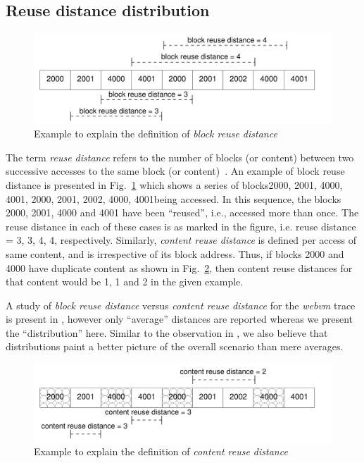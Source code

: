\subsection{Reuse distance distribution}

\begin{figure}
	\centering
	\includegraphics[scale=0.6]{tracechar-figures/21-day/reusedist-example.pdf}
	\caption{Example to explain the definition of \textit{block reuse distance}}
	\label{fig:reusedist-example}
\end{figure}

The term \textit{reuse distance} refers to the number of blocks (or content)
between two successive accesses to the same block (or content)~\cite{iodedup}. 
An example of block reuse distance is
presented in Fig.~\ref{fig:reusedist-example} which shows a series
of blocks\textemdash{}2000, 2001, 4000, 4001, 2000, 2001, 2002, 4000, 4001\textemdash{}being
accessed. In this sequence, the blocks 2000, 2001, 4000 and 4001 have
been ``reused'', i.e., accessed more than once. The reuse distance in
each of these cases is as marked in the figure, i.e. reuse distance
= 3, 3, 4, 4, respectively. Similarly, \textit{content reuse distance}
is defined per access of same content, and is irrespective of its block 
address. Thus, if blocks 2000 and 4000 have duplicate content as shown
in Fig.~\ref{fig:content-reusedist-example}, then content reuse distances
for that content would be 1, 1 and 2 in the given example.

A study of \textit{block reuse distance} versus \textit{content reuse distance}
for the \textit{webvm} trace is present in \cite{iodedup}, however only
``average'' distances are reported whereas we present the ``distribution'' here.
Similar to the observation in \cite{commercial-characterization}, we also
believe that distributions paint a better picture of the overall scenario
than mere averages.


\begin{figure}
	\centering
	\includegraphics[scale=0.6]{tracechar-figures/21-day/content-reusedist-example.pdf}
	\caption{Example to explain the definition of \textit{content reuse distance}}
	\label{fig:content-reusedist-example}
\end{figure}


